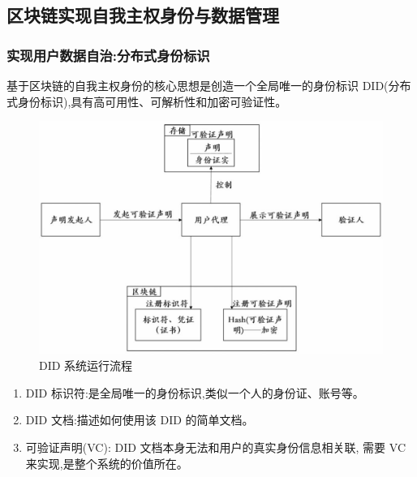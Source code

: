 \documentclass[11pt]{beamer}
\begin{document}
\subsection{区块链实现自我主权身份与数据管理}
\begin{frame}[allowframebreaks]
	\frametitle{实现用户数据自治:分布式身份标识}
	基于区块链的自我主权身份的核心思想是创造一个全局唯一的身份标识
	DID(分布式身份标识),具有高可用性、可解析性和加密可验证性。

	\begin{minipage}[t]{0.5\linewidth}
	\begin{figure}
		\centering
		\includegraphics[width=\linewidth]{figures/eid/2}
		\caption{DID 系统运行流程}
	\end{figure}
\end{minipage}%
\begin{minipage}[t]{0.5\linewidth}
{\footnotesize 	\begin{enumerate}
	\item DID 标识符:是全局唯一的身份标识,类似一个人的身份证、账号等。
	\item DID 文档:描述如何使用该 DID 的简单文档。
	\item 可验证声明(VC): DID 文档本身无法和用户的真实身份信息相关联,
	需要 VC 来实现,是整个系统的价值所在。
\end{enumerate}}
\end{minipage}%
\end{frame}
\end{document}
